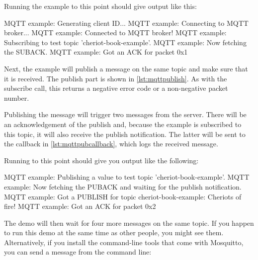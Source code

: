 \codelisting[filename=examples/mqtt/mqtt.cc,marker=ack_callback,label=lst:mqttackcallback,caption="Callback for acknowledging MQTT messages."]{}

Running the example to this point should give output like this:

\begin{console}
MQTT example: Generating client ID...
MQTT example: Connecting to MQTT broker...
MQTT example: Connected to MQTT broker!
MQTT example: Subscribing to test topic 'cheriot-book-example'.
MQTT example: Now fetching the SUBACK.
MQTT example: Got an ACK for packet 0x1
\end{console}

Next, the example will publish a message on the same topic and make sure that it is received.
The publish part is shown in \ref{lst:mqttpublish}.
As with the subscribe call, this returns a negative error code or a non-negative packet number.

\codelisting[filename=examples/mqtt/mqtt.cc,marker=publish,label=lst:mqttpublish,caption="Publishing to an MQTT topic."]{}

Publishing the message will trigger two messages from the server.
There will be an acknowledgement of the publish and, because the example is subscribed to this topic, it will also receive the publish notification.
The latter will be sent to the callback in \ref{lst:mqttpubcallback}, which logs the received message.

\codelisting[filename=examples/mqtt/mqtt.cc,marker=publish_callback,label=lst:mqttpubcallback,caption="Callback for receiving published MQTT messages."]{}

Running to this point should give you output like the following:

\begin{console}
MQTT example: Publishing a value to test topic 'cheriot-book-example'.
MQTT example: Now fetching the PUBACK and waiting for the publish notification.
MQTT example: Got a PUBLISH for topic cheriot-book-example: Cheriots of fire!
MQTT example: Got an ACK for packet 0x2
\end{console}

The demo will then wait for four more messages on the same topic.
If you happen to run this demo at the same time as other people, you might see them.
Alternatively, if you install the command-line tools that come with Mosquitto, you can send a message from the command line:


